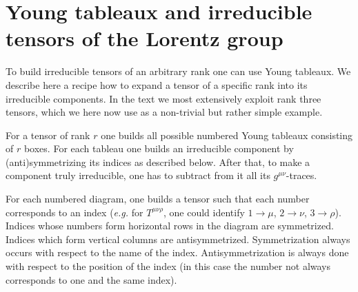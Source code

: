 \documentclass[12pt]{revtex4}
\newcommand{\md}{\mathcal{D}}
\begin{document}



%
%
\newpage
\section{Young tableaux and irreducible tensors of the Lorentz group}
\label{young}

	To build irreducible tensors of an arbitrary rank one can use
	Young tableaux. 
	We describe here a recipe how to expand a tensor of a specific
	rank into its irreducible components.
	In the text we most extensively exploit rank three tensors, which
	we here now use as a non-trivial but rather simple example.

	For a tensor of rank $ r $ one builds all possible numbered 
	Young tableaux consisting of $ r $ boxes.
	For each tableau one builds an irreducible component by 
	(anti)symmetrizing its indices as described below.
	After that, to make a component truly irreducible, one has to 
	subtract from it all its $ g^{\mu\nu} $-traces.

	For each numbered diagram, one builds a tensor such that
	each number corresponds to an index ({\it e.g.} 
	for $ T^{\mu\nu\rho} $, one could identify $ 1 \to \mu $,  
	$ 2 \to \nu $,  $ 3 \to \rho $).
	Indices whose numbers form horizontal rows in the diagram
	are symmetrized. 
	Indices which form vertical columns are antisymmetrized.
	Symmetrization always occurs with respect to the name
	of the index.
	Antisymmetrization is always done with respect to the
	position of the index (in this case the number not always
	corresponds to one and the same index).
\end{document}

